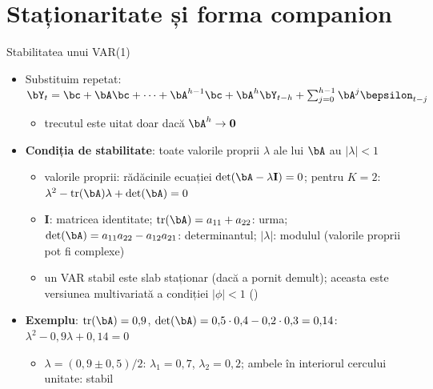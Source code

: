 \section{Staționaritate și forma companion}

\begin{frame}{Stabilitatea unui VAR(1)}
\itemsize{\small}
\begin{itemize}
    \item Substituim repetat: $\bY_t = \bc + \bA\bc + \dots + \bA^{h-1}\bc + \bA^h\bY_{t-h} + \sum_{j=0}^{h-1}\bA^j\bepsilon_{t-j}$
    \begin{itemize}
        \item trecutul este uitat doar dacă $\bA^h \to \mathbf{0}$
    \end{itemize}
    \item \textbf{Condiția de stabilitate}: toate valorile proprii $\lambda$ ale lui $\bA$ au $|\lambda| < 1$
    \begin{itemize}
        \item valorile proprii: rădăcinile ecuației $\det(\bA - \lambda\mathbf{I}) = 0$; pentru $K = 2$: $\lambda^2 - \mathrm{tr}(\bA)\lambda + \det(\bA) = 0$
        \item $\mathbf{I}$: matricea identitate; $\mathrm{tr}(\bA) = a_{11} + a_{22}$: urma; $\det(\bA) = a_{11}a_{22} - a_{12}a_{21}$: determinantul; $|\lambda|$: modulul (valorile proprii pot fi complexe)
        \item un VAR stabil este slab staționar (dacă a pornit demult); aceasta este versiunea multivariată a condiției $|\phi| < 1$ ()
    \end{itemize}
    \item \textbf{Exemplu}: $\mathrm{tr}(\bA) = 0{,}9$, $\det(\bA) = 0{,}5 \cdot 0{,}4 - 0{,}2 \cdot 0{,}3 = 0{,}14$: $\lambda^2 - 0{,}9\lambda + 0{,}14 = 0$
    \begin{itemize}
        \item $\lambda = (0{,}9 \pm 0{,}5)/2$: $\lambda_1 = 0{,}7$, $\lambda_2 = 0{,}2$; ambele în interiorul cercului unitate: stabil
    \end{itemize}
\end{itemize}
\end{frame}

